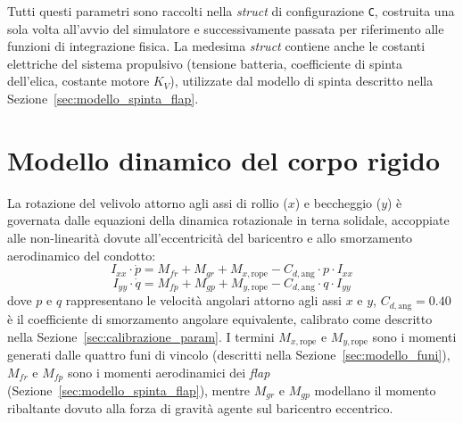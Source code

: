 \documentclass[11pt]{report}
\begin{document}
	Tutti questi parametri sono raccolti nella \textit{struct} di configurazione \texttt{C}, costruita una sola volta all'avvio del simulatore e successivamente passata per riferimento alle funzioni di integrazione fisica. La medesima \textit{struct} contiene anche le costanti elettriche del sistema propulsivo (tensione batteria, coefficiente di spinta dell'elica, costante motore $K_V$), utilizzate dal modello di spinta descritto nella Sezione~\ref{sec:modello_spinta_flap}.
	
	\section{Modello dinamico del corpo rigido}
	\label{sec:dinamica_sim}
	
	La rotazione del velivolo attorno agli assi di rollio ($x$) e beccheggio ($y$) è governata dalle equazioni della dinamica rotazionale in terna solidale, accoppiate alle non-linearità dovute all'eccentricità del baricentro e allo smorzamento aerodinamico del condotto:
	\begin{equation}
		I_{xx} \cdot \dot p = M_{fr} + M_{gr} + M_{x,\text{rope}} - C_{d,\text{ang}} \cdot p \cdot I_{xx}
		\label{eq:dinamica_roll}
	\end{equation}
	\begin{equation}
		I_{yy} \cdot \dot q = M_{fp} + M_{gp} + M_{y,\text{rope}} - C_{d,\text{ang}} \cdot q \cdot I_{yy}
		\label{eq:dinamica_pitch}
	\end{equation}
	dove $p$ e $q$ rappresentano le velocità angolari attorno agli assi $x$ e $y$, $C_{d,\text{ang}} = 0.40$ è il coefficiente di smorzamento angolare equivalente, calibrato come descritto nella Sezione~\ref{sec:calibrazione_param}. I termini $M_{x,\text{rope}}$ e $M_{y,\text{rope}}$ sono i momenti generati dalle quattro funi di vincolo (descritti nella Sezione~\ref{sec:modello_funi}), $M_{fr}$ e $M_{fp}$ sono i momenti aerodinamici dei \textit{flap} (Sezione~\ref{sec:modello_spinta_flap}), mentre $M_{gr}$ e $M_{gp}$ modellano il momento ribaltante dovuto alla forza di gravità agente sul baricentro eccentrico.
	
\end{document}
